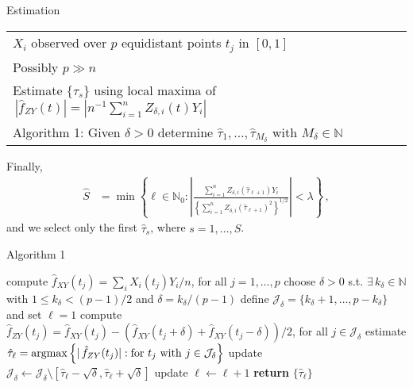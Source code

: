 \begin{frame}{Estimation}
    \vspace{-1cm}
    \begin{table}[]
    \renewcommand{\arraystretch}{2}
        \begin{tabular}{ll}
           $X_i$ observed over $p$ equidistant points $t_j$ in $[0, 1]$\\
           Possibly $p \gg n$\\
           Estimate $\{\tau_s\}$ using local maxima of $\,|\hat{f}_{ZY}(t)| = |n^{-1} \sum_{i=1}^n
          Z_{\delta, i}(t) Y_i |$\\
           Algorithm 1: Given $\delta > 0$ determine $\hat{\tau}_1, \dots,
          \hat{\tau}_{M_{\delta}}$ with $M_{\delta} \in \mathbb{N}$
        \end{tabular}
    \end{table}

Finally,
\vspace{-0.8cm}
\begin{align*}
    \hat{S} &= \min \left\{\ell \in \mathbb{N}_0 : \left|\frac{\sum_{i = 1}^n Z_{\delta,
i}(\hat{\tau}_{\ell + 1}) Y_i}{\left\{\sum_{i=1}^n Z_{\delta, i} (\hat{\tau}_{\ell +
1})^2\right\}^{1/2}}
\right| < \lambda \right\} \,,
\end{align*}
and we select only the first $\hat{\tau}_s$, where $s = 1, \dots, \hat{S}$.

\end{frame}


\begin{frame}{Algorithm 1}

\vspace{-0.5cm}
\begin{algorithm}[H]
\begin{algorithmic}[1]
  \State compute $\hat{f}_{XY}(t_j) = \sum_i X_i(t_j) Y_i / n$, for all $j=1,\dots,p$
  \State choose $\delta > 0$ s.t. $\exists \, k_{\delta} \in \mathbb{N}$ with $1 \leq
  k_{\delta} < (p - 1)/2$ and $\delta = k_{\delta} / (p-1)$
  \State define $\mathcal{J}_{\delta} = \{k_{\delta} + 1, \dots, p - k_{\delta}\}$ and
  set $\ell = 1$
  \State compute $\hat{f}_{ZY}(t_j) = \hat{f}_{XY}(t_j) - (\hat{f}_{XY}(t_j + \delta) +
  \hat{f}_{XY}(t_j - \delta)) / 2$, for all $j \in \mathcal{J}_{\delta}$
  \State estimate $\hat{\tau}_{\ell} = \operatorname*{argmax} \left\{|\,\hat{f}_{ZY}(t_j)| : \text{for }
      t_j \text{ with } j \in \mathcal{J}_{\delta}\right\}$
    \State update $\mathcal{J}_{\delta} \leftarrow \mathcal{J}_{\delta} \setminus
    [\hat{\tau}_{\ell} - \sqrt{\delta}, \hat{\tau}_{\ell} + \sqrt{\delta}]$
    \State update $\ell \leftarrow \ell + 1$
  \EndWhile
  \State \textbf{return} $\{\hat{\tau}_{\ell}\}$
\end{algorithmic}
\end{algorithm}

\end{frame}


